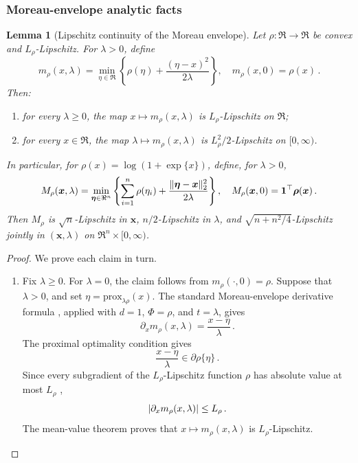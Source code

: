 \documentclass{article}
\makeatletter
\newtheorem{lemma}{Lemma}
\theoremstyle{definition}
\newcommand{\vnorm}[1]{%
	\ensuremath{%
		\if@display
		\left\| #1 \right\|
		\else
		\| #1 \|
		\fi
	}%
}
\newcommand{\abs}[1]{%
	\ensuremath{%
		\if@display
		\left| #1 \right|
		\else
		\lvert #1 \rvert
		\fi
	}%
}
\newcommand*{\bb}{\boldsymbol}
\newcommand{\prox}[2]{\ensuremath{\textrm{prox}_{#1}\left(#2\right)}}
\def\bx{\bb{x}}
\makeatother
\begin{document}
\begin{bibunit}
\subsubsection{Moreau-envelope analytic facts}


\begin{lemma}[Lipschitz continuity of the Moreau envelope]
\label{lemma:moreau_lipschitz}
Let $\rho:\Re\to\Re$ be convex and $L_\rho$-Lipschitz. For $\lambda>0$,
define
$$
    m_\rho(x,\lambda)
    =
    \underset{\eta\in\Re}{\min}
    \left\{
        \rho(\eta)
        +
        \frac{(\eta-x)^2}{2\lambda}
    \right\},
    \quad
    m_\rho(x,0)=\rho(x)\,.
$$
Then:
\begin{enumerate}[label=(\roman{*})]
    \item for every $\lambda\geq0$, the map
    $x\mapsto m_\rho(x,\lambda)$ is $L_\rho$-Lipschitz on $\Re$;

    \item for every $x\in\Re$, the map
    $\lambda\mapsto m_\rho(x,\lambda)$ is
    $L_\rho^2/2$-Lipschitz on $[0,\infty)$.
\end{enumerate}
In particular, for $\rho(x)=\log(1+\exp\{x\})$, define, for $\lambda>0$,
$$
    M_\rho(\bx,\lambda)
    =
    \underset{\bb\eta\in\Re^n}{\min}
    \left\{
        \sum_{i=1}^n\rho(\eta_i)
        +
        \frac{\vnorm{\bb\eta-\bx}_2^2}{2\lambda}
    \right\},
    \quad
    M_\rho(\bx,0)
    =
    \bb1^\top\bb\rho(\bx)\,.
$$
Then $M_\rho$ is $\sqrt n$-Lipschitz in $\bx$,
$n/2$-Lipschitz in $\lambda$, and
$\sqrt{n+n^2/4}$-Lipschitz jointly in $(\bx,\lambda)$ on
$\Re^n\times[0,\infty)$.
\end{lemma}

\begin{proof}
We prove each claim in turn.
\begin{enumerate}[label=(\roman{*})]
    \item
    Fix $\lambda\geq0$. For $\lambda=0$, the claim follows from
    $m_\rho(\cdot,0)=\rho$. Suppose that $\lambda>0$, and set
    $\eta=\prox{\lambda\rho}{x}$. The standard
    Moreau-envelope derivative formula
    \citep[Lemma~2, equation~(29)]{salehi+et+al:2019}, applied with
    $d=1$, $\Phi=\rho$, and $t=\lambda$, gives
    $$
        \partial_xm_\rho(x,\lambda)
        =
        \frac{x-\eta}{\lambda}\,.
    $$
    The proximal optimality condition
    \citep[cf.][Theorem~6.39]{beck:2017} gives
    $$
        \frac{x-\eta}{\lambda}
        \in
        \partial\rho\{\eta\}\,.
    $$
    Since every subgradient of the $L_\rho$-Lipschitz function $\rho$
    has absolute value at most $L_\rho$
    \citep[cf.][Theorem~3.61]{beck:2017},
    $$
        \abs{\partial_xm_\rho(x,\lambda)}
        \leq
        L_\rho\,.
    $$
    The mean-value theorem proves that
    $x\mapsto m_\rho(x,\lambda)$ is $L_\rho$-Lipschitz.


\end{enumerate}
\end{proof}
\end{bibunit}
\end{document}
